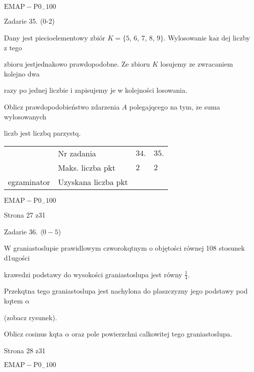 \documentclass[a4paper,12pt]{article}
\begin{document}
$\mathrm{E}\mathrm{M}\mathrm{A}\mathrm{P}-\mathrm{P}0_{-}100$





Zadarie 35. (0-2)

Dany jest piecioelementowy zbiór $K=\{5$, 6, 7, 8, 9$\}$. Wylosowanie $\mathrm{k}\mathrm{a}\dot{\mathrm{z}}$ dej liczby z tego

zbioru jestjednakowo prawdopodobne. Ze zbioru $K$ losujemy ze zwracaniem kolejno dwa

razy po jednej liczbie i zapisujemy je w kolejności losowania.

Oblicz prawdopodobieństwo zdarzenia $A$ polegajqcego na tym, $\dot{\mathrm{z}}\mathrm{e}$ suma wylosowanych

liczb jest liczbq parzystq.
\begin{center}
\begin{tabular}{|l|l|l|l|}
\cline{2-4}
&	\multicolumn{1}{|l|}{Nr zadania}&	\multicolumn{1}{|l|}{$34.$}&	\multicolumn{1}{|l|}{ $35.$}	\\
\cline{2-4}
&	\multicolumn{1}{|l|}{Maks. liczba pkt}&	\multicolumn{1}{|l|}{$2$}&	\multicolumn{1}{|l|}{ $2$}	\\
\cline{2-4}
\multicolumn{1}{|l|}{egzaminator}&	\multicolumn{1}{|l|}{Uzyskana liczba pkt}&	\multicolumn{1}{|l|}{}&	\multicolumn{1}{|l|}{}	\\
\hline
\end{tabular}

\end{center}
$\mathrm{E}\mathrm{M}\mathrm{A}\mathrm{P}-\mathrm{P}0_{-}100$

Strona 27 z31





Zadarie 36. $\langle 0-5$)

$\mathrm{W}$ graniastoslupie prawidlowym czworokqtnym o objętości równej 108 stosunek d1ugości

krawedzi podstawy do wysokości graniastoslupa jest równy $\displaystyle \frac{1}{4}.$

Przekqtna tego graniastoslupa jest nachylona do plaszczyzny jego podstawy pod kqtem $\alpha$

(zobacz rysunek).

Oblicz cosinus kqta $\alpha$ oraz pole powierzchni calkowitej tego graniastoslupa.

Strona 28 z31

$\mathrm{E}\mathrm{M}\mathrm{A}\mathrm{P}-\mathrm{P}0_{-}100$
\end{document}
